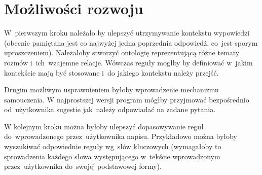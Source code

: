 \documentclass[11pt,a4paper]{article}
\begin{document}
\section{Możliwości rozwoju}
W~pierwszym kroku należało by ulepszyć utrzymywanie kontekstu wypowiedzi
(obecnie pamiętana jest co najwyżej jedna poprzednia odpowiedź, co~jest sporym
uproszczeniem). Należałoby stworzyć ontologię reprezentującą różne tematy
rozmów i~ich~wzajemne relacje. Wówczas reguły mogłby by definiować w~jakim kontekście
mają być stosowane i~do jakiego kontekstu należy przejść.

Drugim możliwym usprawnieniem byłoby wprowadzenie mechanizmu samouczenia.
W najprostszej wersji program mógłby przyjmować bezpośrednio
od~użytkownika sugestie jak~należy odpowiadać na zadane pytania.

W kolejnym kroku można byłoby ulepszyć dopasowywanie reguł do~wprowadzonego
przez~użytkownika napisu. Przykładowo można byłoby wyszukiwać odpowiednie
reguły wg~słów kluczowych (wymagałoby to sprowadzenia każdego słowa
występującego w~tekście wprowadzonym przez~użytkownika do~swojej podstawowej
formy).
\end{document}
